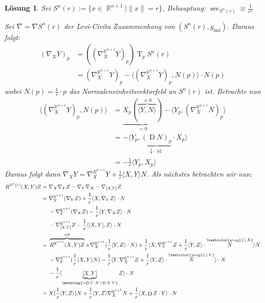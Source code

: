 \documentclass[paper=A4, twoside, chapterprefix=true, bibliography=totoc, headsepline]{scrbook}
\DeclareMathOperator{\R}{\mathbb{R}}
\DeclareMathOperator{\id}{id}       %
\DeclareMathOperator{\D}{D}         %
\DeclareMathOperator{\T}{T}         %
\theoremstyle{plain}
\theoremstyle{nonumberplain}
\theoremstyle{empty}
\theoremstyle{break}
\newtheorem{Loes}{L\"osung}
\begin{document}
\begin{Loes}
Sei $S^n(r) := \{x \in \R^{n+1} \mid \|x\| = r\}$, \emph{Behauptung:} $\sec_{S^n(r)} \equiv \frac{1}{r^2}$

Sei $\nabla = \nabla S^n(r)$ der Levi-Civita Zusammenhang von $(S^n(r), g_{\text{ind}})$. Daraus folgt:
\begin{align*}
	(\nabla_X Y)_p &= \left( (\nabla_X^{\R^{n+1}} Y)_p \right) \T_p S^n(r) \\
	&= (\nabla_X^{\R^{n+1}} Y)_p - \langle (\nabla_X^{\R^{n+1}} Y)_p, N(p) \rangle \cdot N(p)
\end{align*}
wobei $N(p) = \frac{1}{r} \cdot p$ das Normaleneinheitsvektorfeld an $S^n(r)$ ist. Betrachte nun
\begin{align*}
	\langle (\nabla_X^{\R^{n+1}} Y)_p, N(p) \rangle &= \underbrace{X_p ( \overbrace{\langle Y, N \rangle}^{\equiv 0} )}_{=0} - \langle Y_p, (\nabla_X^{\R^{n+1}} N)_p \rangle\\
	&= - \langle Y_p, \underbrace{(\D N)_p}_{\frac{1}{r}\cdot\id} \cdot X_p \rangle\\
	&= - \frac{1}{r} \langle Y_p, X_p \rangle
\end{align*}
Daraus folgt dann $\nabla_XY = \nabla_X^{R^{n+1}} Y + \frac{1}{r} \langle X, Y \rangle N$. Als n\"achstes betrachten wir nun:
\begin{align*}
	R^{S^n(r)}(X,Y)Z ={}& \nabla_X \nabla_Y Z - \nabla_Y \nabla_X - \nabla_{[X,Y]}Z\\
	={}& \nabla_X^{\R^{n+1}} (\nabla_Y Z) + \frac{1}{r} \langle X, \nabla_Y Z \rangle \cdot N\\
		& - \nabla_Y^{\R^{n+1}} (\nabla_X Z) - \frac{1}{r} \langle Y, \nabla_X Z \rangle \cdot N\\
		& - \nabla_{[X,Y]}^{\R^{n+1}} Z - \frac{1}{r} \langle [X,Y], Z \rangle \cdot N\\
	={}& \overbrace{R^{\R^{n+1}} (X,Y)Z}^{=0} + \nabla_X^{\R^{n+1}} (\frac{1}{r} \langle Y, Z \rangle \cdot N) + \frac{1}{r} \langle X, \nabla_Y^{\R^{n+1}} Z + \frac{1}{r} \langle Y, Z \rangle \cdot \overset{\textcolor{gray}{\perp X}}{N} \rangle N\\
		& - \nabla_Y^{\R^{n+1}} ( \frac{1}{r} \langle X, Y \rangle N) - \frac{1}{r} \langle Y, \nabla_X^{\R^{n+1}} Z + \frac{1}{r} \langle Y, Z \rangle \cdot \overset{\textcolor{gray}{\perp Y}}{N} \rangle \cdot N\\
		& - \frac{1}{r} \langle \underbrace{[X,Y]}_{\mathclap{=\D Y \cdot X - \D X \cdot Y}} Z \rangle \cdot N\\
	={}& X(\frac{1}{r} \langle Y, Z \rangle) N + \frac{1}{r} \langle Y, Z \rangle \nabla_X^{\R^{n+1}} N + \frac{1}{r} \langle X, \D Z \cdot Y \rangle \cdot N\\

\end{align*}
\end{Loes}
\end{document}

